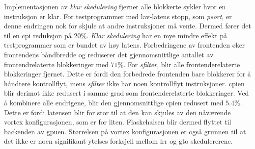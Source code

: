 Implementasjonen av \textit{klar skedulering} fjerner alle blokkerte sykler hvor en instruksjon er klar. For testprogrammer med lav-latens stopp, som \textit{psort}, er denne endringen nok for skjule at andre instruksjoner må vente. Dermed fører det til en \acrshort{cpi} reduksjon på $20\%$. \textit{Klar skedulering} har en mye mindre effekt på testprogrammer som er bundet av høy latens. Forbedringene av frontenden øker frontendens båndbredde og reduserer det gjennomsnittlige antallet av frontendrelaterte blokkeringer med $71\%$. For \textit{sfilter}, blir alle frontenderelaterte blokkeringer fjernet. Dette er fordi den forbedrede frontenden bare blokkerer for å håndtere kontrollflyt, mens \textit{sfilter} ikke har noen kontrollflyt instruksjoner. \acrshort{cpi}en blir derimot ikke redusert i samme grad som frontenderelaterte blokkeringer. Ved å kombinere alle endrigene, blir den gjennomsnittlige \acrshort{cpi}en redusert med $5.4\%$. Dette er fordi latensen blir for stor til at den kan skjules av den nåværende \Gls{vortex} konfigurasjonen, som er for liten. Flaskehalsen blir dermed flyttet til backenden av \acrshort{gpu}en. Størrelsen på \Gls{vortex} konfigurasjonen er også grunnen til at det ikke er noen signifikant ytelses forksjell mellom \acrshort{lrr} og \acrshort{gto} skedulererene.